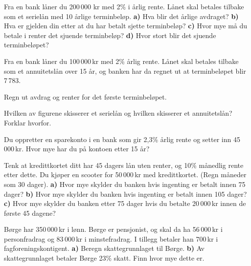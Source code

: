 \nes

Fra en bank låner du 200\,000 kr med 2\% i årlig rente. Lånet skal betales tilbake som et serielån med 10 årlige terminbeløp. \os
\textbf{a)} Hva blir det årlige avdraget?\os
\textbf{b)} Hva er gjelden din etter at du har betalt sjette terminbeløp?\os
\textbf{c)} Hvor mye må du betale i renter det sjuende terminbeløp?\os
\textbf{d)} Hvor stort blir det sjuende terminbeløpet?\os 

Fra en bank låner du 100\,000\,kr med 2\% årlig rente. Lånet skal betales tilbake som et annuitetslån over 15 år, og banken har da regnet ut at terminbeløpet blir 7\,783.\os

Regn ut avdrag og renter for det første terminbeløpet.

Hvilken av figurene skisserer et serielån og hvilken skisserer et annuitetslån? Forklar hvorfor.
\begin{figure}	\centering
	\;
\end{figure}

Du oppretter en sparekonto i en bank som gir 2,3\% årlig rente og setter inn 45\,000\,kr. Hvor mye har du på kontoen etter 15 år?

Tenk at kredittkortet ditt har 45 dagers lån uten renter, og 10\% månedlig rente etter dette. Du kjøper en scooter for 50\,000\,kr med kredittkortet. (Regn måneder som 30 dager).\os
\textbf{a)} Hvor mye skylder du banken hvis ingenting er betalt innen 75 dager?\os
\textbf{b)} Hvor mye skylder du banken hvis ingenting er betalt innen 105 dager?\os 
\textbf{c)} Hvor mye skylder du banken etter 75 dager hvis du betalte 20\,000\,kr innen de første 45 dagene?



\nes

Børge har 350\,000\,kr i lønn. Børge er pensjonist, og skal da ha 56\,000\,kr i personfradrag og 83\,000\,kr i minstefradrag. I tillegg betaler han 700\,kr i fagforeningskontigent. \os
\textbf{a)} Beregn skattegrunnlaget til Børge.\os
\textbf{b)} Av skattegrunnlaget betaler Børge 23\% skatt. Finn hvor mye dette er.

